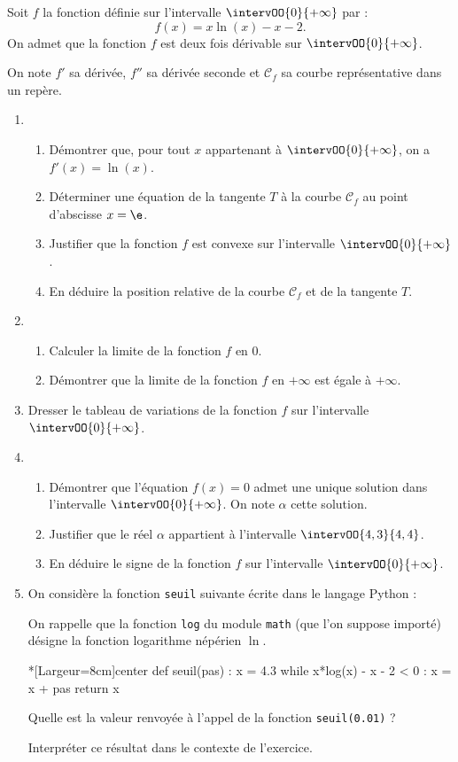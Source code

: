 Soit $f$ la fonction définie sur l'intervalle $\intervOO{0}{+\infty}$ par : \[f(x) = x \ln (x) - x - 2.\]
%
On admet que la fonction $f$ est deux fois dérivable sur $\intervOO{0}{+\infty}$.

On note $f'$ sa dérivée, $f''$ sa dérivée seconde et $\mathcal{C}_f$ sa courbe représentative dans un repère.

\begin{enumerate}
	\item 
	\begin{enumerate}
		\item Démontrer que, pour tout $x$ appartenant à $\intervOO{0}{+\infty}$, on a $f'(x) = \ln(x)$.
		\item Déterminer une équation de la tangente $T$ à la courbe $\mathcal{C}_f$ au point
		d'abscisse $x = \e$.
		\item Justifier que la fonction $f$ est convexe sur l'intervalle $\intervOO{0}{+\infty}$.
		\item En déduire la position relative de la courbe $\mathcal{C}_f$ et de la tangente $T$.
	\end{enumerate}
	\item 
	\begin{enumerate}
		\item Calculer la limite de la fonction $f$ en $0$.
		\item Démontrer que la limite de la fonction $f$ en $+\infty$ est égale à $+\infty$.
	\end{enumerate}
	\item Dresser le tableau de variations de la fonction $f$ sur l'intervalle $\intervOO{0}{+\infty}$.
	\item 
	\begin{enumerate}
		\item Démontrer que l'équation $f(x) = 0$ admet une unique solution dans l'intervalle $\intervOO{0}{+\infty}$. On note $\alpha$ cette solution.
		\item Justifier que le réel $\alpha$ appartient à l'intervalle $\intervOO{4,3}{4,4}$.
		\item En déduire le signe de la fonction $f$ sur l'intervalle $\intervOO{0}{+\infty}$.
	\end{enumerate}
	\item On considère la fonction \texttt{seuil} suivante écrite dans le langage \textsf{Python} :
	
	On rappelle que la fonction \texttt{log} du module \texttt{math} (que l'on suppose importé)
	désigne la fonction logarithme népérien $\ln$.
	
\begin{CodePythonLstAlt}*[Largeur=8cm]{center}
def seuil(pas) :
	x = 4.3
	while x*log(x) - x - 2 < 0 :
		x = x + pas
	return x
\end{CodePythonLstAlt}
	
	Quelle est la valeur renvoyée à l'appel de la fonction \texttt{seuil(0.01)} ?
	
	Interpréter ce résultat dans le contexte de l'exercice.
\end{enumerate}

